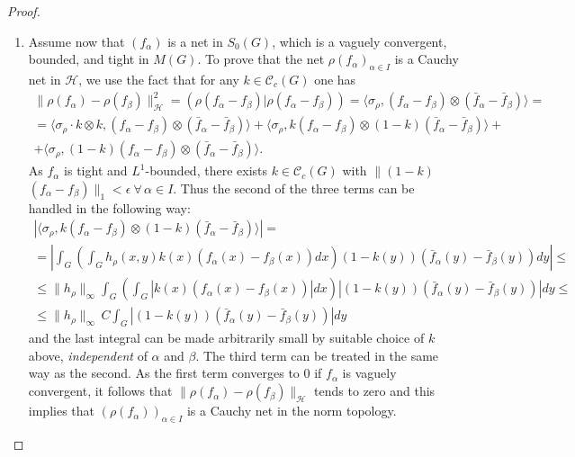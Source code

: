 \documentclass[10pt,a4paper]{amsart}
\begin{document}
\begin{proof}\
\begin{enumerate}
\item[(a)] Assume now that $(f_\alpha)$ is a net in ${S_{0}(G)}$, which  is a vaguely
convergent, bounded, and tight in $M(G)$.
To prove that the net
$\rho(f_{\alpha})_{\alpha \in I}$ is a Cauchy net
in $\mathcal{H}$, we use the fact that for any $k \in \mathcal{C}_c(G)$
one has
\begin{gather*}
\| \rho (f_{\alpha }){-}\rho (f_{\beta })\| ^{2}_{\mathcal{H}}
{=} (\rho (f_{\alpha }-f_{\beta })| \rho (f_{\alpha }-f_{\beta })) {=}
\langle\sigma _{\rho},(f_{\alpha }{-}f_{\beta })\otimes (\bar{f}_{\alpha
}{-}\bar{f}_{\beta })\rangle {=} \\
{=} \langle\sigma _{\rho} \cdot k \otimes k,(f_{\alpha }{-}f_{\beta
})\otimes
(\bar{f}_{\alpha }-\bar{f}_{\beta })\rangle + \langle\sigma _{\rho},k(f_{\alpha }-f_{\beta })\otimes (1-k)(\bar{f}_{\alpha
}-\bar{f}_{\beta })\rangle + \\
+ \langle\sigma _{\rho},(1-k)(f_{\alpha }-f_{\beta })\otimes
(\bar{f}_{\alpha }-\bar{f}_{\beta })\rangle.
\end{gather*}
As $f_{\alpha}$ is tight and $L^{1}$-bounded,
there exists $k \in  \mathcal{C}_c(G)$ with
$\| (1-k)$\break $(f_{\alpha } - f_{\beta })
\| _{1}< \epsilon  \ \forall \,  \alpha  \in I$. Thus
the second of the three terms can be handled in the following way:
\begin{gather*}
| \langle\sigma _{\rho},k(f_{\alpha }-f_{\beta })\otimes
(1-k)(\bar{f}_{\alpha }-\bar{f}_{\beta })\rangle| =
\\
{=} \left| \int^{}_{G} \left( \int^{}_{G}
h_{\rho}(x,y)k(x)(f_{\alpha }(x){-}f_{\beta }(x)) dx \right) (1{-}k(y))(\bar{f}_{\alpha }(y){-}\bar{f}_{\beta
}(y)) dy \right| \le
\\
\le  \| h_{\rho}\| _{\infty
} \int^{}_{G}    \left( \int^{}_{G} | k(x)(f_{\alpha }(x){-}f_{\beta }(x))|  dx \right) |
(1{-}k(y))(\bar{f}_{\alpha }(y)-\bar{f}_{\beta }(y))|  dy \le \\
\le  \| h_{\rho}\| _{\infty } \, C \int^{}_{G} |
(1-k(y))(\bar{f}_{\alpha }(y)-\bar{f}_{\beta }(y))|  dy
\end{gather*}
and the last integral can be made arbitrarily small by suitable
choice of $k$ above, \textit{independent} of $\alpha$ and $\beta$.
The third term can be treated in the same way as the second.
As the first term  converges to  0 if $f_{\alpha}$
is  vaguely convergent, it follows that
$\| \rho (f_{\alpha}) - \rho (f_{\beta})\| _{\mathcal{H}}$
tends to zero and this implies
that $(\rho (f_{\alpha }))_{\alpha \in I}$
is a Cauchy net in the norm topology.


\end{enumerate}
\end{proof}
\end{document}

